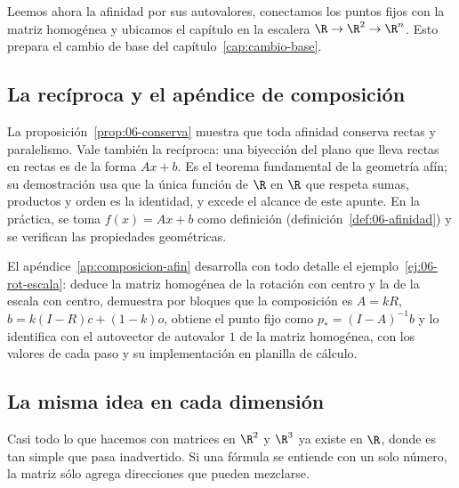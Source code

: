 Leemos ahora la afinidad por sus autovalores, conectamos los puntos fijos con la matriz
homogénea y ubicamos el capítulo en la escalera \(\R\to\R^2\to\R^n\). Esto prepara el cambio
de base del capítulo~\ref{cap:cambio-base}.

\subsection{La recíproca y el apéndice de composición}\label{sec:06-reciproca}

La proposición~\ref{prop:06-conserva} muestra que toda afinidad conserva rectas y
paralelismo. Vale también la recíproca: una biyección del plano que lleva rectas en rectas
es de la forma \(Ax+b\). Es el teorema fundamental de la geometría afín; su demostración usa
que la única función de \(\R\) en \(\R\) que respeta sumas, productos y orden es la
identidad, y excede el alcance de este apunte. En la práctica, se toma
\(f(x)=Ax+b\) como definición (definición~\ref{def:06-afinidad}) y se verifican las
propiedades geométricas.

El apéndice~\ref{ap:composicion-afin} desarrolla con todo detalle el
ejemplo~\ref{ej:06-rot-escala}: deduce la matriz homogénea de la rotación con centro y la de
la escala con centro, demuestra por bloques que la composición es \(A=kR\),
\(b=k(I-R)c+(1-k)o\), obtiene el punto fijo como \(p_\ast=(I-A)^{-1}b\) y lo identifica con el
autovector de autovalor \(1\) de la matriz homogénea, con los valores de cada paso y su
implementación en planilla de cálculo.

\subsection{La misma idea en cada dimensión}\label{sec:misma-idea}

Casi todo lo que hacemos con matrices en \(\R^2\) y \(\R^3\) ya existe en \(\R\), donde es tan
simple que pasa inadvertido. Si una fórmula se entiende con un solo número, la matriz sólo
agrega direcciones que pueden mezclarse.

